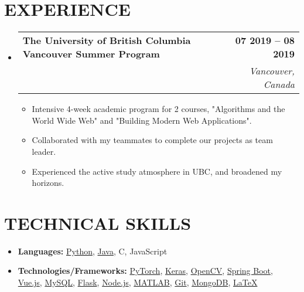 \documentclass[letterpaper,11pt]{article}
\makeatletter
\newcommand{\resumeItem}[1]{
  \item\small{
    {#1 \vspace{-2pt}}
  }
}
\newcommand{\resumeSubheading}[4]{
  \vspace{-2pt}\item
    \begin{tabular*}{1.0\textwidth}[t]{l@{\extracolsep{\fill}}r}
      \textbf{\large#1} & \textbf{\small #2} \\
      \textit{\large#3} & \textit{\small #4} \\
      
    \end{tabular*}\vspace{-7pt}
}
\newcommand{\resumeSubHeadingListStart}{\begin{itemize}[leftmargin=0.0in, label={}]}
\newcommand{\resumeSubHeadingListEnd}{\end{itemize}}
\newcommand{\resumeItemListStart}{\begin{itemize}}
\newcommand{\resumeItemListEnd}{\end{itemize}\vspace{-5pt}}
\makeatother
\begin{document}
\section{EXPERIENCE}
  \resumeSubHeadingListStart
    \resumeSubheading
      {The University of British Columbia Vancouver Summer Program}{07 2019 -- 08 2019}
      {}{Vancouver, Canada}
      \resumeItemListStart
        \resumeItem{\normalsize{Intensive 4-week academic program for 2 courses, "Algorithms and the World Wide Web" and "Building Modern Web Applications".}}
        \resumeItem{\normalsize{Collaborated with my teammates to complete our projects as team leader.}}
        \resumeItem{\normalsize{Experienced the active study atmosphere in UBC, and broadened my horizons.}}
      \resumeItemListEnd
  \resumeSubHeadingListEnd
\vspace{-12pt}


\section{TECHNICAL SKILLS}
  \resumeItemListStart
    \resumeItem{\textbf{\normalsize{Languages:}}{ \normalsize{\href{https://www.python.org/}{Python}, \href{https://www.java.com/}{Java}, C, JavaScript}}}
    \resumeItem{\textbf{\normalsize{Technologies/Frameworks:}}{ \normalsize{\href{https://pytorch.org/}{PyTorch}, \href{https://keras.io/}{Keras}, \href{https://opencv.org/}{OpenCV}, \href{https://spring.io/projects/spring-boot}{Spring Boot}, \href{https://vuejs.org/}{Vue.js}, \href{https://www.mysql.com/}{MySQL}, \href{https://flask.palletsprojects.com/}{Flask}, \href{https://nodejs.org/}{Node.js}, \href{https://www.mathworks.com/products/matlab.html}{MATLAB}, \href{https://git-scm.com/}{Git}, \href{https://www.mongodb.com/}{MongoDB}, \href{https://www.latex-project.org/}{\LaTeX}}}}
  \resumeItemListEnd 


 
\end{document}
